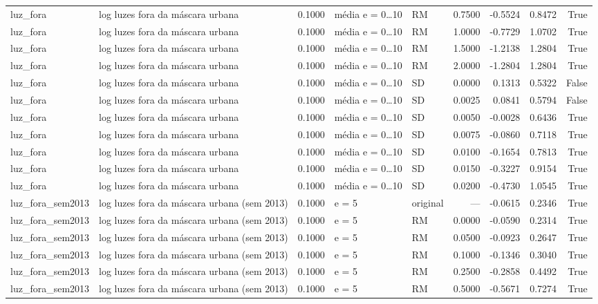 \begin{table}
{\begin{tabular}{llrllrrrr}
luz\_fora & log luzes fora da máscara urbana & 0.1000 & média e = 0…10 & RM & 0.7500 & -0.5524 & 0.8472 & True \\
luz\_fora & log luzes fora da máscara urbana & 0.1000 & média e = 0…10 & RM & 1.0000 & -0.7729 & 1.0702 & True \\
luz\_fora & log luzes fora da máscara urbana & 0.1000 & média e = 0…10 & RM & 1.5000 & -1.2138 & 1.2804 & True \\
luz\_fora & log luzes fora da máscara urbana & 0.1000 & média e = 0…10 & RM & 2.0000 & -1.2804 & 1.2804 & True \\
luz\_fora & log luzes fora da máscara urbana & 0.1000 & média e = 0…10 & SD & 0.0000 & 0.1313 & 0.5322 & False \\
luz\_fora & log luzes fora da máscara urbana & 0.1000 & média e = 0…10 & SD & 0.0025 & 0.0841 & 0.5794 & False \\
luz\_fora & log luzes fora da máscara urbana & 0.1000 & média e = 0…10 & SD & 0.0050 & -0.0028 & 0.6436 & True \\
luz\_fora & log luzes fora da máscara urbana & 0.1000 & média e = 0…10 & SD & 0.0075 & -0.0860 & 0.7118 & True \\
luz\_fora & log luzes fora da máscara urbana & 0.1000 & média e = 0…10 & SD & 0.0100 & -0.1654 & 0.7813 & True \\
luz\_fora & log luzes fora da máscara urbana & 0.1000 & média e = 0…10 & SD & 0.0150 & -0.3227 & 0.9154 & True \\
luz\_fora & log luzes fora da máscara urbana & 0.1000 & média e = 0…10 & SD & 0.0200 & -0.4730 & 1.0545 & True \\
luz\_fora\_sem2013 & log luzes fora da máscara urbana (sem 2013) & 0.1000 & e = 5 & original & — & -0.0615 & 0.2346 & True \\
luz\_fora\_sem2013 & log luzes fora da máscara urbana (sem 2013) & 0.1000 & e = 5 & RM & 0.0000 & -0.0590 & 0.2314 & True \\
luz\_fora\_sem2013 & log luzes fora da máscara urbana (sem 2013) & 0.1000 & e = 5 & RM & 0.0500 & -0.0923 & 0.2647 & True \\
luz\_fora\_sem2013 & log luzes fora da máscara urbana (sem 2013) & 0.1000 & e = 5 & RM & 0.1000 & -0.1346 & 0.3040 & True \\
luz\_fora\_sem2013 & log luzes fora da máscara urbana (sem 2013) & 0.1000 & e = 5 & RM & 0.2500 & -0.2858 & 0.4492 & True \\
luz\_fora\_sem2013 & log luzes fora da máscara urbana (sem 2013) & 0.1000 & e = 5 & RM & 0.5000 & -0.5671 & 0.7274 & True \\

\end{tabular}}
\end{table}
